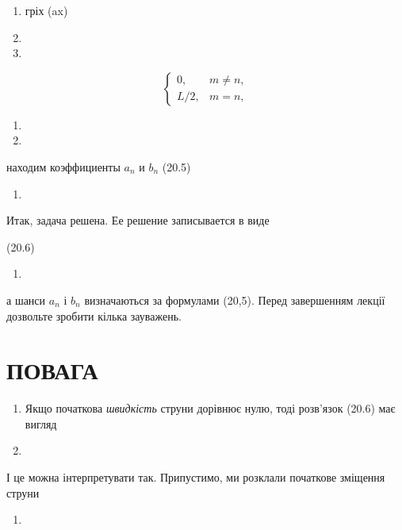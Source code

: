 \documentclass[
  ukrainian,
]{article}
\providecommand{\tightlist}{%
  \setlength{\itemsep}{0pt}\setlength{\parskip}{0pt}}
\begin{document}
\begin{enumerate}
\def\labelenumi{\arabic{enumi}.}
\setcounter{enumi}{19}
\item
  гріх (ax)
\item
\item
\end{enumerate}

\[
\begin{cases} 0, & m \neq n, \\ L/2, & m = n, \end{cases}
\]

\begin{enumerate}
\def\labelenumi{\arabic{enumi}.}
\setcounter{enumi}{9}
\tightlist
\item
\item
\end{enumerate}

находим коэффициенты \(a_n\) и \(b_n\) (20.5)

\begin{enumerate}
\def\labelenumi{\arabic{enumi}.}
\setcounter{enumi}{11}
\tightlist
\item
\end{enumerate}

Итак, задача решена. Ее решение записывается в виде

(20.6)

\begin{enumerate}
\def\labelenumi{\arabic{enumi}.}
\setcounter{enumi}{12}
\tightlist
\item
\end{enumerate}

а шанси \(a_n\) і \(b_n\) визначаються за формулами (20,5). Перед
завершенням лекції дозвольте зробити кілька зауважень.

\section{ПОВАГА}\label{ux43fux43eux432ux430ux433ux430}

\begin{enumerate}
\def\labelenumi{\arabic{enumi}.}
\item
  Якщо початкова \emph{швидкість} струни дорівнює нулю, тоді розв'язок
  (20.6) має вигляд
\item
\end{enumerate}

І це можна інтерпретувати так. Припустимо, ми розклали початкове
зміщення струни

\begin{enumerate}
\def\labelenumi{\arabic{enumi}.}
\setcounter{enumi}{14}
\tightlist
\item
\end{enumerate}
\end{document}

